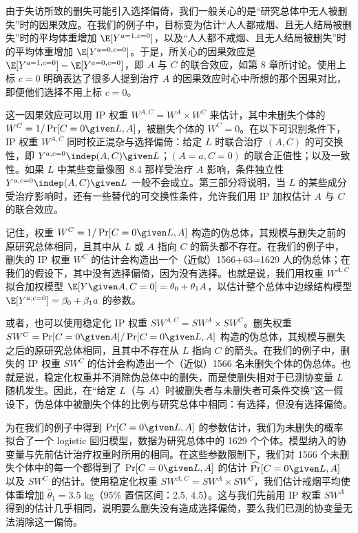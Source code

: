 由于失访所致的删失可能引入选择偏倚，我们一般关心的是“研究总体中无人被删失”时的因果效应。在我们的例子中，目标变为估计“人人都戒烟、且无人结局被删失”时的平均体重增加 $\E[Y^{a=1,c=0}]$，以及“人人都不戒烟、且无人结局被删失”时的平均体重增加 $\E[Y^{a=0,c=0}]$。于是，所关心的因果效应是 $\E[Y^{a=1,c=0}]-\E[Y^{a=0,c=0}]$，即 $A$ 与 $C$ 的联合效应，如第 8 章所讨论。使用上标 $c=0$ 明确表达了很多人提到治疗 $A$ 的因果效应时心中所想的那个因果对比，即便他们选择不用上标 $c=0$。

这一因果效应可以用 IP 权重 $W^{A,C}=W^{A}\times W^{C}$ 来估计，其中未删失个体的 $W^{C}=1/\Pr[C=0\given L,A]$，被删失个体的 $W^{C}=0$。在以下可识别条件下，IP 权重 $W^{A,C}$ 同时校正混杂与选择偏倚：给定 $L$ 时联合治疗 $(A,C)$ 的可交换性，即 $Y^{a,c=0}\indep(A,C)\given L$；$(A=a,C=0)$ 的联合正值性；以及一致性。如果 $L$ 中某些变量像图~8.4 那样受治疗 $A$ 影响，条件独立性 $Y^{a,c=0}\indep(A,C)\given L$ 一般不会成立。第三部分将说明，当 $L$ 的某些成分受治疗影响时，还有一些替代的可交换性条件，允许我们用 IP 加权估计 $A$ 与 $C$ 的联合效应。

记住，权重 $W^{C}=1/\Pr[C=0\given L,A]$ 构造的伪总体，其规模与删失之前的原研究总体相同，且其中从 $L$ 或 $A$ 指向 $C$ 的箭头都不存在。在我们的例子中，删失的 IP 权重 $W^{C}$ 的估计会构造出一个（近似）1566+63=1629 人的伪总体；在我们的假设下，其中没有选择偏倚，因为没有选择。也就是说，我们用权重 $W^{A,C}$ 拟合加权模型 $\E[Y\given A,C=0]=\theta_0+\theta_1A$，以估计整个总体中边缘结构模型 $\E[Y^{a,c=0}]=\beta_0+\beta_1a$ 的参数。

或者，也可以使用稳定化 IP 权重 $SW^{A,C}=SW^{A}\times SW^{C}$。删失权重 $SW^{C}=\Pr[C=0\given A]/\Pr[C=0\given L,A]$ 构造的伪总体，其规模与删失之后的原研究总体相同，且其中不存在从 $L$ 指向 $C$ 的箭头。在我们的例子中，删失的 IP 权重 $SW^{C}$ 的估计会构造出一个（近似）1566 名未删失个体的伪总体。也就是说，稳定化权重并不消除伪总体中的删失，而是使删失相对于已测协变量 $L$ 随机发生。因此，在“给定 $L$（与 $A$）时被删失者与未删失者可条件交换”这一假设下，伪总体中被删失个体的比例与研究总体中相同：有选择，但没有选择偏倚。

为在我们的例子中得到 $\Pr[C=0\given L,A]$ 的参数估计，我们为未删失的概率拟合了一个 logistic 回归模型，数据为研究总体中的 1629 个个体。模型纳入的协变量与先前估计治疗权重时所用的相同。在这些参数限制下，我们对 1566 个未删失个体中的每一个都得到了 $\Pr[C=0\given L,A]$ 的估计 $\widehat{\Pr}[C=0\given L,A]$ 以及 $SW^{C}$ 的估计。使用稳定化权重 $SW^{A,C}=SW^{A}\times SW^{C}$，我们估计戒烟平均使体重增加 $\hat\theta_1=3.5$ kg（95\% 置信区间：2.5, 4.5）。这与我们先前用 IP 权重 $SW^{A}$ 得到的估计几乎相同，说明要么删失没有造成选择偏倚，要么我们已测的协变量无法消除这一偏倚。

